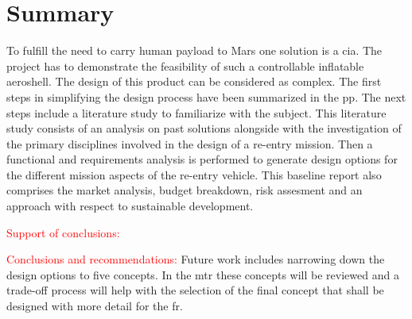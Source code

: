 \section*{Summary}\label{cha:summary}

To fulfill the need to carry human payload to Mars one solution is a \gls{cia}. The project has to demonstrate the feasibility of such a controllable inflatable aeroshell. The design of this product can be considered as complex. The first steps in simplifying the design process have been summarized in the \gls{pp}. The next steps include a literature study to familiarize with the subject. This literature study consists of an analysis on past solutions alongside with the investigation of the primary disciplines involved in the design of a re-entry mission. Then a functional and requirements analysis is performed to generate design options for the different mission aspects of the re-entry vehicle. This baseline report also comprises the market analysis, budget breakdown, risk assesment and an approach with respect to sustainable development. 

\textcolor{red}{Support of conclusions:}

\textcolor{red}{Conclusions and recommendations:}
Future work includes narrowing down the design options to five concepts. In the \gls{mtr} these concepts will be reviewed and a trade-off process will help with the selection of the final concept that shall be designed with more detail for the \gls{fr}.
